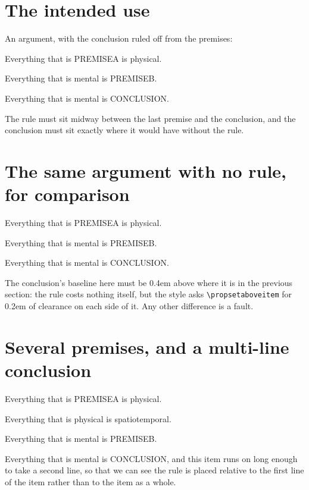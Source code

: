\documentclass{article}
\newcommand\PA{PREMISEA}
\newcommand\PB{PREMISEB}
\newcommand\CC{CONCLUSION}
\begin{document}
\section{The intended use}

An argument, with the conclusion ruled off from the premises:

\begin{prop}
  \item Everything that is \PA{} is physical.
  \item Everything that is mental is \PB.
\end{prop}
\begin{prop}[style=conclusion, continue=true]
  \item Everything that is mental is \CC.
\end{prop}

The rule must sit midway between the last premise and the conclusion, and the
conclusion must sit exactly where it would have without the rule.

\section{The same argument with no rule, for comparison}

\begin{prop}
  \item Everything that is \PA{} is physical.
  \item Everything that is mental is \PB.
\end{prop}
\begin{prop}[continue=true]
  \item Everything that is mental is \CC.
\end{prop}

The conclusion's baseline here must be 0.4em above where it is in the previous
section: the rule costs nothing itself, but the style asks \verb|\propsetaboveitem|
for 0.2em of clearance on each side of it.  Any other difference is a fault.

\section{Several premises, and a multi-line conclusion}

\begin{prop}
  \item Everything that is \PA{} is physical.
  \item Everything that is physical is spatiotemporal.
  \item Everything that is mental is \PB.
\end{prop}
\begin{prop}[style=conclusion, continue=true]
  \item Everything that is mental is \CC, and this item runs on long enough to
    take a second line, so that we can see the rule is placed relative to the
    first line of the item rather than to the item as a whole.
\end{prop}
\end{document}
